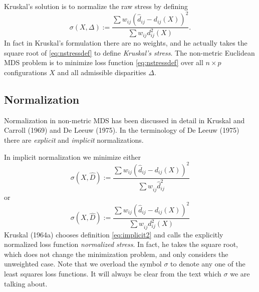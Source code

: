 \documentclass[
  12pt,
]{article}
\begin{document}
Kruskal's solution is to normalize the raw stress by defining
\begin{equation}
\sigma(X,\Delta):=\frac{\sum w_{ij}(\hat d_{ij}-d_{ij}(X))^2}{\sum w_{ij}d_{ij}^2(X)}.
\label{eq:nstressdef}
\end{equation}
In fact in Kruskal's formulation there are no weights, and he actually takes the
square root of \eqref{eq:nstressdef} to define \emph{Kruskal's stress}. The non-metric Euclidean MDS problem is to minimize loss function \eqref{eq:nstressdef} over all \(n\times p\)
configurations \(X\) and all admissible disparities \(\Delta\).

\subsection{Normalization}\label{normalization}

Normalization in non-metric MDS has been discussed in detail in
Kruskal and Carroll (1969) and De Leeuw (1975). In the terminology of
De Leeuw (1975) there are \emph{explicit} and \emph{implicit} normalizations.

In implicit normalization we minimize either
\begin{equation}
\sigma(X,\hat D):=\frac{\sum  w_{ij}(\hat d_{ij} -d_{ij}(X))^2}{\sum   w_{ij}^{\ }\hat d_{ij}^2}
\label{eq:implicit1}
\end{equation}
or
\begin{equation}
\sigma(X,\hat D):=\frac{\sum   w_{ij}(\hat d_{ij}-d_{ij}(X))^2}{\sum   w_{ij}^{\ }d_{ij}^2(X) }
\label{eq:implicit2}
\end{equation}
Kruskal (1964a) chooses definition \eqref{eq:implicit2} and calls the explicitly normalized
loss function \emph{normalized stress}. In fact, he takes the square root, which
does not change the minimization problem, and only considers the
unweighted case. Note that we overload the symbol \(\sigma\) to denote any one
of the least squares loss functions. It will always be clear from the
text which \(\sigma\) we are talking about.
\end{document}
